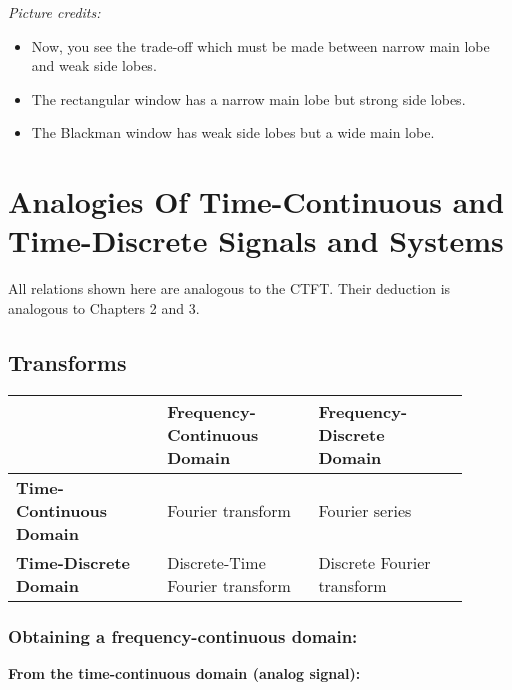 \begin{refsection}
\begin{landscape}
	\textit{Picture credits:} 
	
	\begin{itemize}
		\item Now, you see the trade-off which must be made between narrow main lobe and weak side lobes.
		\item The rectangular window has a narrow main lobe but strong side lobes.
		\item The Blackman window has weak side lobes but a wide main lobe.
	\end{itemize}
\end{landscape}


\section{Analogies Of Time-Continuous and Time-Discrete Signals and Systems}

All relations shown here are analogous to the \ac{CTFT}. Their deduction is analogous to Chapters 2 and 3.

\subsection{Transforms}

\begin{table}[H]
	\centering
	\begin{tabular}{|p{0.3\linewidth}||p{0.3\linewidth}|p{0.3\linewidth}|}
		\hline
		{} & \textbf{Frequency-Continuous Domain} & \textbf{Frequency-Discrete Domain} \\
		\hline
		\hline
		\textbf{Time-Continuous Domain} & Fourier transform & Fourier series \\
		\hline
		\textbf{Time-Discrete Domain} & Discrete-Time Fourier transform & Discrete Fourier transform \\
		\hline
	\end{tabular}
\end{table}

\subsubsection{Obtaining a frequency-continuous domain:}

\begin{minipage}{0.45\linewidth}
	\textbf{From the time-continuous domain (analog signal):}
	

\end{minipage}
\end{refsection}
